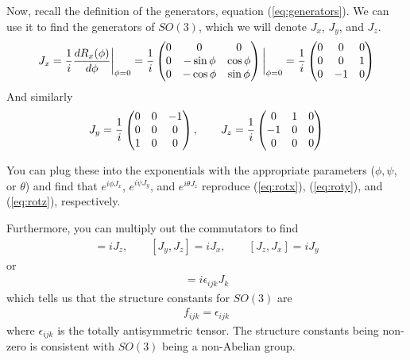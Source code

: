 \documentclass[12pt,epsf]{article}
\def\nolabel{\nonumber }
\def\nolabel{\nonumber }
\begin{document}
Now, recall the definition of the generators, equation
(\ref{eq:generators}).	We can use it to find the generators of
$SO(3)$, which we will denote $J_x$, $J_y$, and $J_z$.	
\begin{eqnarray}
J_x = {1\over i} {dR_x(\phi) \over d\phi}\bigg|_{\phi=0} = {1\over i}
\begin{pmatrix}
0 & 0 & 0 \\ 0 & -\sin \phi & \cos \phi \\ 0 & -\cos \phi & \sin \phi
\end{pmatrix} \bigg|_{\phi=0}  = {1\over i} 
\begin{pmatrix}
0 & 0 & 0 \\ 0 & 0 & 1 \\ 0 & -1 & 0
\end{pmatrix} \nolabel 
\end{eqnarray}
And similarly 
\begin{eqnarray}
J_y = {1\over i} 
\begin{pmatrix}
0 & 0 & -1 \\ 0 & 0 & 0 \\ 1 & 0 & 0
\end{pmatrix}, \qquad
J_z = {1\over i}
\begin{pmatrix}
0 & 1 & 0 \\ -1 & 0 & 0 \\ 0 & 0 & 0
\end{pmatrix}\nolabel 
\end{eqnarray}

You can plug these into the exponentials with the appropriate
parameters ($\phi, \psi$, or $\theta$) and find that $e^{i\phi
J_x}$, $e^{i\psi J_y}$, and $e^{i\theta J_z}$ reproduce (\ref{eq:rotx}),
(\ref{eq:roty}), and (\ref{eq:rotz}), respectively.  

Furthermore, you can multiply out the commutators to find
\begin{eqnarray}
[J_x,J_y] = iJ_z, \qquad [J_y,J_z] = iJ_x, \qquad [J_z,J_x] = iJ_y
\nolabel 
\end{eqnarray}
or
\begin{eqnarray}
[J_i,J_j] = i\epsilon_{ijk}J_k \nolabel 
\end{eqnarray}
which tells us that the structure constants for $SO(3)$ are 
\begin{eqnarray}
f_{ijk} = \epsilon_{ijk} \label{eq:so3structure}
\end{eqnarray}
where $\epsilon_{ijk}$ is the totally antisymmetric tensor.  The
structure constants being non-zero is consistent with $SO(3)$ being a
non-Abelian group.  
\end{document}
